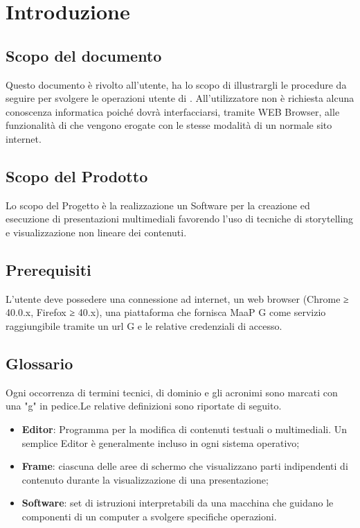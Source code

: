 \section{Introduzione}
\subsection{Scopo del documento}
Questo documento è rivolto all’utente, ha lo scopo di illustrargli le procedure da seguire per svolgere le operazioni utente di \premi . All'utilizzatore non è richiesta alcuna conoscenza informatica poiché dovrà interfacciarsi, tramite WEB Browser, alle funzionalità di \premi che vengono erogate con le stesse modalità di un normale sito internet.
\subsection{Scopo del Prodotto}
Lo scopo del Progetto è la realizzazione un Software per la creazione ed esecuzione di presentazioni multimediali favorendo l’uso di tecniche di storytelling e visualizzazione non lineare dei contenuti.
\subsection{Prerequisiti}
L’utente deve possedere una connessione ad internet, un web browser (Chrome ≥ 40.0.x, Firefox ≥ 40.x), una piattaforma che fornisca MaaP G come servizio raggiungibile tramite un url G e le
relative credenziali di accesso.
\subsection{Glossario}
Ogni occorrenza di termini tecnici, di dominio e gli acronimi sono marcati con una "g" in pedice.Le relative definizioni sono riportate di seguito.
\begin{itemize}
\item \textbf{Editor}: Programma per la modifica di contenuti testuali o multimediali. Un semplice Editor è generalmente incluso in ogni sistema operativo;
\item \textbf{Frame}: ciascuna delle aree di schermo che visualizzano parti indipendenti di contenuto durante la visualizzazione di una presentazione;
\item \textbf{Software}: set di istruzioni interpretabili da una macchina che guidano le componenti di un computer a svolgere specifiche operazioni.
\end{itemize}



